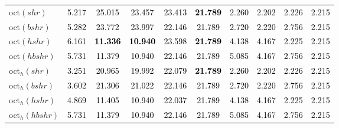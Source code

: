 \begin{tabular}[t]{l|>{}ccccccccc}
oct$(shr)$ & \textcolor{black}{5.217} & \textcolor{black}{25.015} & \textcolor{black}{23.457} & \textcolor{black}{23.413} & \textcolor{black}{\textbf{21.789}} & \textcolor{black}{2.260} & \textcolor{black}{2.202} & \textcolor{black}{2.226} & \textcolor{black}{2.215}\\
oct$(bshr)$ & \textcolor{black}{5.282} & \textcolor{black}{23.772} & \textcolor{black}{23.997} & \textcolor{black}{22.146} & \textcolor{black}{21.789} & \textcolor{black}{2.720} & \textcolor{black}{2.220} & \textcolor{black}{2.756} & \textcolor{black}{2.215}\\
oct$(hshr)$ & \textcolor{black}{6.161} & \textcolor{black}{\textbf{11.336}} & \textcolor{black}{\textbf{10.940}} & \textcolor{black}{23.598} & \textcolor{black}{\textbf{21.789}} & \textcolor{black}{4.138} & \textcolor{black}{4.167} & \textcolor{black}{2.225} & \textcolor{black}{2.215}\\
oct$(hbshr)$ & \textcolor{black}{5.731} & \textcolor{black}{11.379} & \textcolor{black}{10.940} & \textcolor{black}{22.146} & \textcolor{black}{21.789} & \textcolor{black}{5.085} & \textcolor{black}{4.167} & \textcolor{black}{2.756} & \textcolor{black}{2.215}\\
oct$_h(shr)$ & \textcolor{black}{3.251} & \textcolor{black}{20.965} & \textcolor{black}{19.992} & \textcolor{black}{22.079} & \textcolor{black}{\textbf{21.789}} & \textcolor{black}{2.260} & \textcolor{black}{2.202} & \textcolor{black}{2.226} & \textcolor{black}{2.215}\\
oct$_h(bshr)$ & \textcolor{black}{3.602} & \textcolor{black}{21.306} & \textcolor{black}{21.022} & \textcolor{black}{22.146} & \textcolor{black}{21.789} & \textcolor{black}{2.720} & \textcolor{black}{2.220} & \textcolor{black}{2.756} & \textcolor{black}{2.215}\\
oct$_h(hshr)$ & \textcolor{black}{4.869} & \textcolor{black}{11.405} & \textcolor{black}{10.940} & \textcolor{black}{22.037} & \textcolor{black}{21.789} & \textcolor{black}{4.138} & \textcolor{black}{4.167} & \textcolor{black}{2.225} & \textcolor{black}{2.215}\\
oct$_h(hbshr)$ & \textcolor{black}{5.731} & \textcolor{black}{11.379} & \textcolor{black}{10.940} & \textcolor{black}{22.146} & \textcolor{black}{21.789} & \textcolor{black}{5.085} & \textcolor{black}{4.167} & \textcolor{black}{2.756} & \textcolor{black}{2.215}\\
\bottomrule
\end{tabular}
